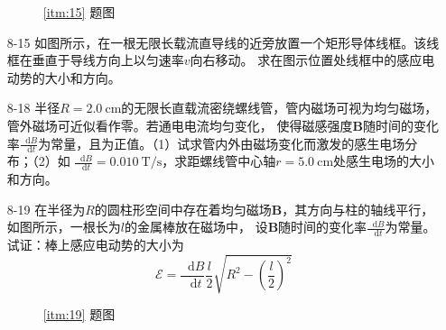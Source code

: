 \documentclass[UTF-8]{ctexart}
\makeatletter
\newcommand{\mlabel}[2]{#2\def\@currentlabel{#2}\label{#1}}
\newcommand{\csi}[2]{ \SI{#1}{#2}}
\newcommand*{\dif}{\mathop{}\!\mathrm{d}}
\makeatother
\begin{document}
\begin{enumerate}
\begin{figure}[htb]
\begin{minipage}[b]{0.4\textwidth}
                \caption{\ref{itm:15} 题图}
            \end{minipage}
        \end{figure}
    \item[\mlabel{itm:15}{8-15}] 如图所示，在一根无限长载流直导线的近旁放置一个矩形导体线框。该线框在垂直于导线方向上以匀速率\(v\)向右移动。
        求在图示位置处线框中的感应电动势的大小和方向。
    \item[\mlabel{itm:18}{8-18}] 半径\(R=\csi{2.0}{\cm}\)的无限长直载流密绕螺线管，管内磁场可视为均匀磁场，管外磁场可近似看作零。若通电电流均匀变化，
        使得磁感强度\(\bm{B}\)随时间的变化率\(\frac{\dif B}{\dif t}\)为常量，且为正值。（1）试求管内外由磁场变化而激发的感生电场分布；（2）如
        \(\frac{\dif B}{\dif t}=\csi{0.010}{\tesla\per\second}\)，求距螺线管中心轴\(r=\csi{5.0}{\cm}\)处感生电场的大小和方向。
    \item[\mlabel{itm:19}{8-19}] 在半径为\(R\)的圆柱形空间中存在着均匀磁场\(\bm{B}\)，其方向与柱的轴线平行，如图所示，一根长为\(l\)的金属棒放在磁场中，
        设\(\bm{B}\)随时间的变化率\(\frac{\dif B}{\dif t}\)为常量。试证：棒上感应电动势的大小为
        \[\mathscr{E}=\frac{\dif B}{\dif t} \frac{l}{2} \sqrt{R^2-(\frac{l}{2})^2}\]
        \begin{figure}[htb]
            \centering
            \begin{minipage}[b]{0.4\textwidth}
                \centering
                \caption{\ref{itm:19} 题图}
            \end{minipage}

\end{figure}
\end{enumerate}
\end{document}
